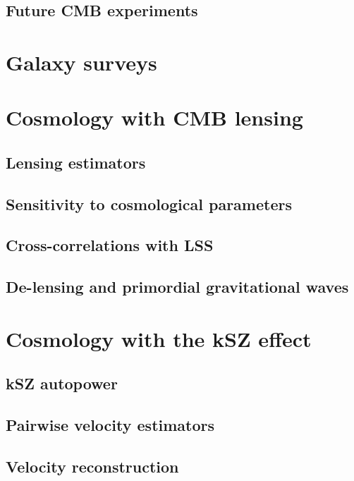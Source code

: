 \documentclass[aps,nofootinbib,groupedaddress]{revtex4}
\begin{document}
\subsection{Future CMB experiments}

\section{Galaxy surveys}

\section{Cosmology with CMB lensing}

\subsection{Lensing estimators}

\subsection{Sensitivity to cosmological parameters}

\subsection{Cross-correlations with LSS}

\subsection{De-lensing and primordial gravitational waves}

\section{Cosmology with the kSZ effect}

\subsection{kSZ autopower}

\subsection{Pairwise velocity estimators}

\subsection{Velocity reconstruction}
\end{document}
